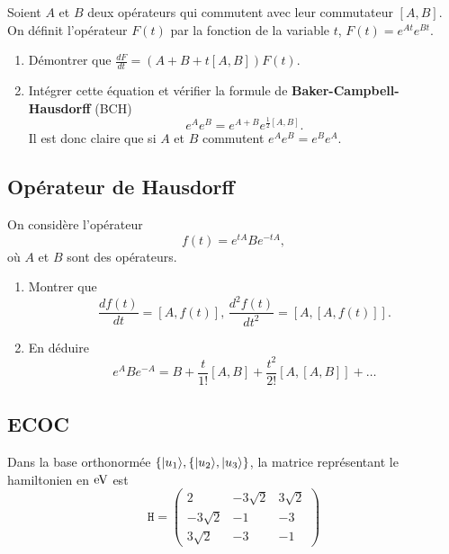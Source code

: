 {\label{sec:BCH1} Soient $A$ et $B$ deux opérateurs qui commutent avec leur
commutateur $[A,B]$. On définit l'opérateur $F(t)$ par la fonction de la
variable $t$, $F(t)=e^{At}e^{Bt}$.

\begin{enumerate}
\item Démontrer que $\frac{dF}{dt}=(A+B+t[A,B])F(t)$.

\item Intégrer cette équation et vérifier la formule de
\textbf{Baker-Campbell-Hausdorff}  (BCH)
\begin{equation}
e^{A}e^{B}=e^{A+B}e^{\frac{1}{2}[A,B]}.
\end{equation}
Il est donc claire que si $A$ et $B$ commutent $e^{A}e^{B}=e^{B}e^{A}$.
\end{enumerate}

\subsection{Opérateur de Hausdorff}

\label{sec:IdOp1} On considère l'opérateur
\begin{equation}
f(t)=e^{tA}Be^{-tA},
\end{equation}
où $A$ et $B$ sont des opérateurs.

\begin{enumerate}
\item Montrer que%
\begin{equation}
\frac{df(t)}{dt}=[A,f(t)],\,\frac{d^2f(t)}{dt^2}=[A,[A,f(t)]].
\end{equation}

\item En déduire
\begin{equation}
e^{A}Be^{-A}=B+\frac{t}{1!}[A,B]+\frac{t^{2}}{2!}[A,[A,B]]+\ldots
\end{equation}

\end{enumerate}

\subsection{ECOC}
\label{ECOC}
Dans la base orthonormée $\{\vert u_1\rangle,\{\vert u_2\rangle,\vert u_3\rangle\}$, la matrice
représentant le hamiltonien en $\operatorname{eV}$ est%
\begin{equation}
\mathtt{H}=\begin{pmatrix}
2 & -3\sqrt{2} & 3\sqrt{2}\\
-3\sqrt{2} & -1 & -3\\
3\sqrt{2} & -3 & -1
\end{pmatrix}
\end{equation}

}
